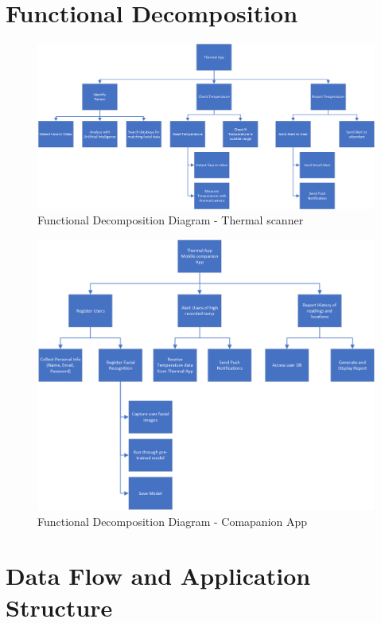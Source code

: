 \documentclass[12pt, letterpaper]{article}
\begin{document}
    \section{Functional Decomposition}
    \begin{figure}
        \centering
        \includegraphics{Function diagram-Thermal App.png}
        \caption{Functional Decomposition Diagram - Thermal scanner}
    \end{figure}
    \begin{figure}
        \centering
        \includegraphics{Function diagram-Mobile Comapanion App.png}
        \caption{Functional Decomposition Diagram - Comapanion App}
    \end{figure}
    
    \section{Data Flow and Application Structure}
\end{document}
